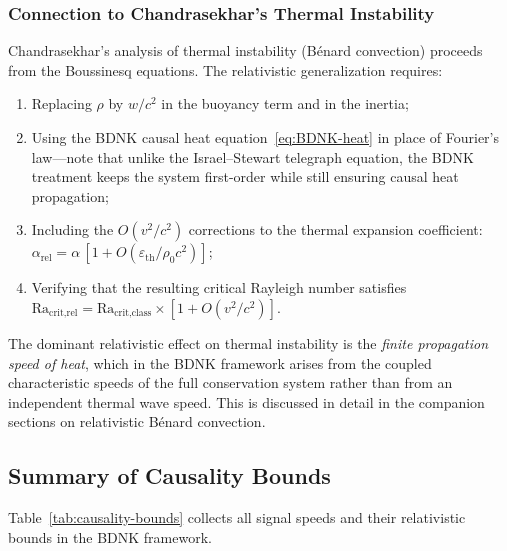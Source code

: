 \subsubsection{Connection to Chandrasekhar's Thermal Instability}
Chandrasekhar's analysis of thermal instability (B\'enard convection)
proceeds from the Boussinesq equations.  The relativistic
generalization requires:
\begin{enumerate}
  \item Replacing $\rho$ by $w/c^{2}$ in the buoyancy term and in the
    inertia;
  \item Using the BDNK causal heat
    equation~\eqref{eq:BDNK-heat} in place of Fourier's law---note
    that unlike the Israel--Stewart telegraph equation, the BDNK
    treatment keeps the system first-order while still ensuring causal
    heat propagation;
  \item Including the $O(v^{2}/c^{2})$ corrections to the thermal
    expansion coefficient:
    $\alpha_{\text{rel}} = \alpha\,[1 + O(\varepsilon_{\text{th}}/\rho_{0}c^{2})]$;
  \item Verifying that the resulting critical Rayleigh number satisfies
    $\text{Ra}_{\text{crit,rel}} = \text{Ra}_{\text{crit,class}}
    \times [1 + O(v^{2}/c^{2})]$.
\end{enumerate}
The dominant relativistic effect on thermal instability is the
\emph{finite propagation speed of heat}, which in the BDNK framework
arises from the coupled characteristic speeds of the full
conservation system rather than from an independent thermal wave speed.
This is discussed in detail in the companion sections on relativistic
B\'enard convection.


\subsection{Summary of Causality Bounds}
\label{subsec:causality-summary}

Table~\ref{tab:causality-bounds} collects all signal speeds and their
relativistic bounds in the BDNK framework.

